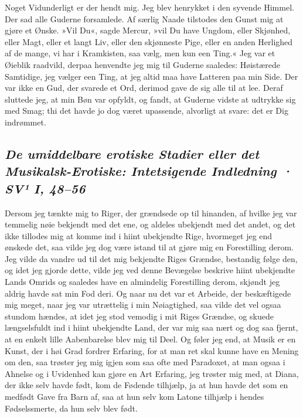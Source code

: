 \documentclass[12pt,a4paper]{article}
\newcommand{\sectionheading}[1]{\subsection*{\normalfont\itshape #1}}
\begin{document}
Noget Vidunderligt er der hendt mig. Jeg blev henrykket i den syvende Himmel. Der sad alle Guderne forsamlede. Af særlig Naade tilstodes den Gunst mig at gjøre et Ønske. »Vil Du«, sagde Mercur, »vil Du have Ungdom, eller Skjønhed, eller Magt, eller et langt Liv, eller den skjønneste Pige, eller en anden Herlighed af de mange, vi har i Kramkisten, saa vælg, men kun een Ting.« Jeg var et Øieblik raadvild, derpaa henvendte jeg mig til Guderne saaledes: Høistærede Samtidige, jeg vælger een Ting, at jeg altid maa have Latteren paa min Side. Der var ikke en Gud, der svarede et Ord, derimod gave de sig alle til at lee. Deraf sluttede jeg, at min Bøn var opfyldt, og fandt, at Guderne vidste at udtrykke sig med Smag; thi det havde jo dog været upassende, alvorligt at svare: det er Dig indrømmet.

\sectionheading{De umiddelbare erotiske Stadier eller det Musikalsk-Erotiske: Intetsigende Indledning  ·  SV¹ I, 48–56}

Dersom jeg tænkte mig to Riger, der grændsede op til hinanden, af hvilke jeg var temmelig nøie bekjendt med det ene, og aldeles ubekjendt med det andet, og det ikke tillodes mig at komme ind i hiint ubekjendte Rige, hvormeget jeg end ønskede det, saa vilde jeg dog være istand til at gjøre mig en Forestilling derom. Jeg vilde da vandre ud til det mig bekjendte Riges Grændse, bestandig følge den, og idet jeg gjorde dette, vilde jeg ved denne Bevægelse beskrive hiint ubekjendte Lands Omrids og saaledes have en almindelig Forestilling derom, skjøndt jeg aldrig havde sat min Fod deri. Og naar nu det var et Arbeide, der beskæftigede mig meget, naar jeg var utrættelig i min Nøiagtighed, saa vilde det vel ogsaa stundom hændes, at idet jeg stod vemodig i mit Riges Grændse, og skuede længselsfuldt ind i hiint ubekjendte Land, der var mig saa nært og dog saa fjernt, at en enkelt lille Aabenbarelse blev mig til Deel. Og føler jeg end, at Musik er en Kunst, der i høi Grad fordrer Erfaring, for at man ret skal kunne have en Mening om den, saa trøster jeg mig igjen som saa ofte med Paradoxet, at man ogsaa i Ahnelse og i Uvidenhed kan gjøre en Art Erfaring, jeg trøster mig med, at Diana, der ikke selv havde født, kom de Fødende tilhjælp, ja at hun havde det som en medfødt Gave fra Barn af, saa at hun selv kom Latone tilhjælp i hendes Fødselssmerte, da hun selv blev født.
\end{document}
